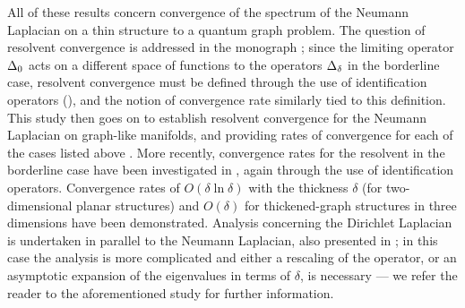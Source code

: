 All of these results concern convergence of the spectrum of the Neumann Laplacian on a thin structure to a quantum graph problem.
The question of resolvent convergence is addressed in the monograph \cite{post2012spectral}; since the limiting operator $\Delta_0$ acts on a different space of functions to the operators $\Delta_{\delta}$ in the borderline case, resolvent convergence must be defined through the use of identification operators (\cite[section 4]{post2012spectral}), and the notion of convergence rate similarly tied to this definition.
This study then goes on to establish resolvent convergence for the Neumann Laplacian on graph-like manifolds, and providing rates of convergence for each of the cases listed above \cite[theorem 1.3.2]{post2012spectral}.
More recently, convergence rates for the resolvent in the borderline case have been investigated in \cite{cherednichenko2022norm}, again through the use of identification operators.
Convergence rates of $O(\delta\ln\delta)$ with the thickness $\delta$ (for two-dimensional planar structures) and $O(\delta)$ for thickened-graph structures in three dimensions have been demonstrated.
Analysis concerning the Dirichlet Laplacian is undertaken in parallel to the Neumann Laplacian, also presented in \cite{post2012spectral}; in this case the analysis is more complicated and either a rescaling of the operator, or an asymptotic expansion of the eigenvalues in terms of $\delta$, is necessary --- we refer the reader to the aforementioned study for further information.

